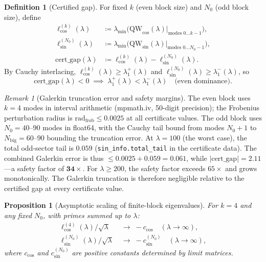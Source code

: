 \documentclass[12pt,a4paper]{article}
\newtheorem{proposition}[theorem]{Proposition}
\theoremstyle{definition}
\newtheorem{definition}[theorem]{Definition}
\theoremstyle{remark}
\newtheorem{remark}[theorem]{Remark}
\begin{document}
\begin{definition}[Certified gap]
For fixed $k$ (even block size) and $N_0$ (odd block size), define
\begin{align*}
  \ell_{\cos}^{(k)}(\lambda) &\coloneqq \lambda_{\min}\!\bigl(\mathrm{QW}_{\cos}(\lambda)\big|_{\text{modes }0\ldots k-1}\bigr), \\
  \ell_{\sin}^{(N_0)}(\lambda) &\coloneqq \lambda_{\min}\!\bigl(\mathrm{QW}_{\sin}(\lambda)\big|_{\text{modes }0\ldots N_0-1}\bigr), \\
  \mathrm{cert\_gap}(\lambda) &\coloneqq \ell_{\cos}^{(k)}(\lambda) - \ell_{\sin}^{(N_0)}(\lambda).
\end{align*}
By Cauchy interlacing, $\ell_{\cos}^{(k)}(\lambda) \geq \lambda_1^+(\lambda)$ and $\ell_{\sin}^{(N_0)}(\lambda) \geq \lambda_1^-(\lambda)$, so
\[
  \mathrm{cert\_gap}(\lambda) < 0 \;\implies\; \lambda_1^+(\lambda) < \lambda_1^-(\lambda) \quad\text{(even dominance).}
\]
\end{definition}

\begin{remark}[Galerkin truncation error and safety margins]
\label{rem:galerkin-safety}
The even block uses $k = 4$ modes in interval arithmetic (mpmath.iv, 50-digit precision); the Frobenius perturbation radius is $\mathrm{rad}_{\mathrm{frob}} \leq 0.0025$ at all certificate values. The odd block uses $N_0 = 40$--$90$ modes in float64, with the Cauchy tail bound from modes $N_0+1$ to $N_{\mathrm{big}} = 60$--$90$ bounding the truncation error. At $\lambda = 100$ (the worst case), the total odd-sector tail is $0.059$ (\texttt{sin\_info.total\_tail} in the certificate data). The combined Galerkin error is thus $\leq 0.0025 + 0.059 = 0.061$, while $|\mathrm{cert\_gap}| = 2.11$---a safety factor of $\mathbf{34\times}$. For $\lambda \geq 200$, the safety factor exceeds $65\times$ and grows monotonically. The Galerkin truncation is therefore negligible relative to the certified gap at every certificate value.
\end{remark}

\begin{proposition}[Asymptotic scaling of finite-block eigenvalues]
\label{prop:scaling}
For $k = 4$ and any fixed $N_0$, with primes summed up to $\lambda$:
\begin{align}
  \ell_{\cos}^{(4)}(\lambda) / \sqrt{\lambda} &\;\to\; -c_{\cos} \quad (\lambda \to \infty), \label{eq:ccos-limit} \\
  \ell_{\sin}^{(N_0)}(\lambda) / \sqrt{\lambda} &\;\to\; -c_{\sin}^{(N_0)} \quad (\lambda \to \infty), \label{eq:csin-limit}
\end{align}
where $c_{\cos}$ and $c_{\sin}^{(N_0)}$ are positive constants determined by limit matrices.
\end{proposition}
\end{document}
